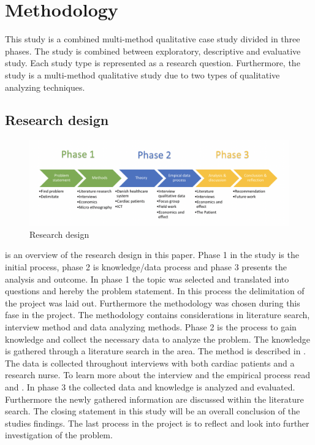 \chapter{Methodology}

This study is a combined multi-method qualitative case study divided in three phases.
The study is combined between exploratory, descriptive and evaluative study. Each study type is represented as a research question. Furthermore, the study is a multi-method qualitative study due to two types of qualitative analyzing techniques. 
\section{Research design}

\begin{figure}[H]
\centering
\includegraphics[width=1.10\textwidth]{Figure/researchdesign.png}
\caption{Research design}
\label{fig:Researchdesign}
\end{figure} 

 is an overview of the research design in this paper.
 Phase 1 in the study is the initial process, phase 2 is knowledge/data process and phase 3 presents the analysis and outcome. 
In phase 1 the topic was selected and translated into questions and hereby the problem statement. In this process the delimitation of the project was laid out. Furthermore the methodology was chosen during this fase in the project. The methodology contains considerations in literature search, interview method and data analyzing methods. 
Phase 2 is the process to gain knowledge and collect the necessary data to analyze the problem. The knowledge is gathered through a literature search in the area. The method is described in . The data is collected throughout interviews with both cardiac patients and a research nurse. To learn more about the interview and the empirical process read  and .
In phase 3 the collected data and knowledge is analyzed and evaluated. Furthermore the newly gathered information are discussed within the literature search. The closing statement in this study will be an overall conclusion of the studies findings. The last process in the project is to reflect and look into further investigation of the problem. 



